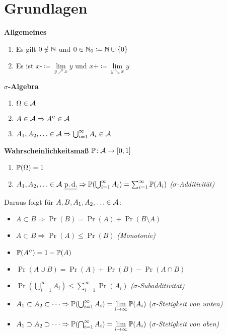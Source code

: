 \section{Grundlagen}

\textbf{Allgemeines}
\begin{enumerate}
	\item Es gilt $0\notin\mathbb{N}$ und $0\in\mathbb{N}_0\coloneqq\mathbb{N}\cup\{0\}$
	\item Es ist $x\text{-}\coloneqq\lim\limits_{y\nearrow x}y$ und $x\text{+}\coloneqq\lim\limits_{y\searrow x}y$
\end{enumerate}

\textbf{$\sigma$-Algebra}
\begin{enumerate}
\item $\Omega\in\mathcal{A}$
\item $A\in\mathcal{A} \Rightarrow A^{\text{\tiny C}}\in\mathcal{A}$
\item $A_1,A_2,\ldots\in\mathcal{A} \Rightarrow \bigcup_{i=1}^{\infty} A_i \in\mathcal{A}$
\end{enumerate}

\textbf{Wahrscheinlichkeitsmaß} $\mathbb{P}\!: \mathcal{A} \rightarrow [0,1]$
\begin{enumerate}
\item $\mathbb{P}(\Omega) = 1$
\item $A_1,A_2,\ldots\in\mathcal{A}\ \underline{\operatorname{p.d.}} \Rightarrow
  \mathbb{P}(\bigcup_{i=1}^{\infty} A_i) = \sum_{i=1}^{\infty} \mathbb{P}(A_i)$
  \hfill\textit{($\sigma$-Additivität)}
\end{enumerate}

Daraus folgt für $A,B,A_1,A_2,\ldots\in\mathcal{A}$:
\begin{itemize}
\item $A \subset B \Rightarrow \Pr(B) = \Pr(A) + \Pr(B \setminus A)$
\item $A \subset B \Rightarrow \Pr(A) \leq \Pr(B)$ \hfill\textit{(Monotonie)}
\item $\mathbb{P}(A^{\text{\tiny C}}) = 1 - \mathbb{P}(A)$
\item $\Pr(A \cup B) = \Pr(A) + \Pr(B) - \Pr(A \cap B)$
\item $\Pr(\bigcup_{i=1}^{\infty} A_i) \leq \sum_{i=1}^{\infty} \Pr(A_i)$
  \hfill\textit{($\sigma$-Subadditivität)}
\item $A_1 \subset A_2 \subset \cdots \Rightarrow
  \mathbb{P}(\bigcup_{i=1}^{\infty} A_i) = \lim\limits_{i\to\infty} \mathbb{P}(A_i)$
  \hfill(\textit{$\sigma$-Stetigkeit von unten)}
\item $A_1 \supset A_2 \supset \cdots \Rightarrow
  \mathbb{P}(\bigcap_{i=1}^{\infty} A_i) = \lim\limits_{i\to\infty} \mathbb{P}(A_i)$
  \hfill(\textit{$\sigma$-Stetigkeit von oben)}
\end{itemize}

